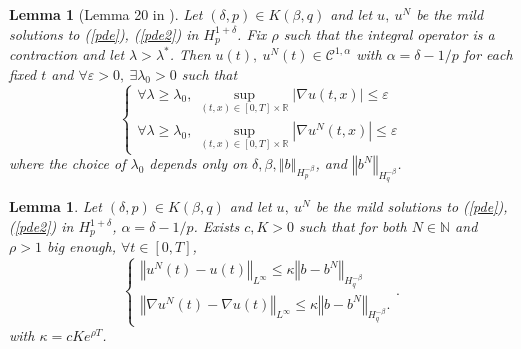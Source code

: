 \documentclass[11pt]{article}
\newtheorem{lem}[theo]{Lemma}
\newcommand{\norme}[1]{\left\Vert #1\right\Vert}
\newcommand{\R}{\mathbb{R}}
\newcommand{\N}{\mathbb{N}}
\begin{document}
    \begin{lem}[Lemma 20 in \cite{Fla-Iss-Rus-2017}]\label{lem}
        Let $(\delta,p)\in K(\beta,q)$ and let $u,\ u^N$ be the mild solutions to (\ref{pde}), (\ref{pde2}) in $H_p^{1+\delta}$. Fix $\rho$ such that the integral operator is a contraction and let $\lambda>\lambda^*$. Then $u(t),\ u^N(t)\in\mathcal{C}^{1,\alpha}$ with $\alpha=\delta-1/p$ for each fixed $t$ and $\forall\varepsilon>0,\ \exists\lambda_0>0$ such that
        \begin{equation*}
        \begin{cases}\forall\lambda\geq\lambda_0,\
        \underset{(t,x)\in[0,T]\times\R}{\sup} |\nabla u(t,x)| \leq\varepsilon  \\ \forall\lambda\geq\lambda_0,\
        \underset{(t,x)\in[0,T]\times\R}{\sup} |\nabla u^N(t,x)| \leq\varepsilon
        \end{cases}
        \end{equation*}
        where the choice of $\lambda_0$ depends only on $\delta,\beta,\norme{b}_{H_p^{-\beta}}$, and $\norme{b^N}_{H_q^{-\beta}}$.
    \end{lem}
    
    \begin{lem}\label{morrey} Let $(\delta,p)\in K(\beta,q)$ and let $u,\ u^N$ be the mild solutions to (\ref{pde}),(\ref{pde2}) in $H_p^{1+\delta}$, $\alpha = \delta - 1/p$. Exists $c,K>0$ such that for both $N\in\N$ and $\rho>1$ big enough, $\forall t\in[0,T]$,
        \begin{equation}
        \begin{cases}
        \norme{u^N(t) - u(t)}_{L^\infty}\leq \kappa\norme{b-b^N}_{H^{-\beta}_{q}}\\        
        \norme{\nabla u^N(t) - \nabla u(t)}_{L^\infty}\leq \kappa \norme{b-b^N}_{H^{-\beta}_{q}}.
        \end{cases} .
        \end{equation}
        with $\kappa = c Ke^{\rho T}$.
    \end{lem}    
    
\end{document}

